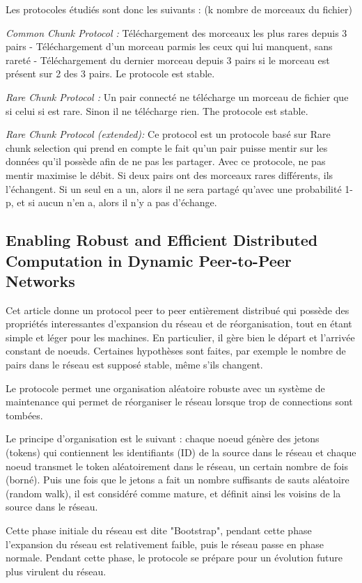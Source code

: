 \documentclass{article}
\begin{document}
Les protocoles étudiés sont donc les suivants : (k nombre de morceaux du fichier)

\emph{Common Chunk Protocol : }Téléchargement des morceaux les plus rares depuis 3 pairs  - Téléchargement
d'un morceau parmis les ceux qui lui manquent, sans rareté - Téléchargement du dernier morceau depuis 3 pairs
si le morceau est présent sur 2 des 3 pairs. Le protocole est stable.

\emph{Rare Chunk Protocol : }
Un pair connecté ne télécharge un morceau de fichier que si celui si est rare. Sinon il ne télécharge rien.
The protocole est stable.

\emph{Rare Chunk Protocol (extended): }Ce protocol est un protocole basé sur Rare chunk selection qui prend en compte
le fait qu'un pair puisse mentir sur les données qu'il possède afin de ne pas les partager. Avec ce protocole, ne pas mentir maximise le débit. Si deux pairs ont des morceaux rares différents, ils l'échangent. Si un seul en a un,
alors il ne sera partagé qu'avec une probabilité 1-p, et si aucun n'en a, alors il n'y a pas d'échange.

\subsection{Enabling Robust and Efficient Distributed Computation in Dynamic Peer-to-Peer Networks
\cite{7354403}
}

Cet article donne un protocol peer to peer entièrement distribué qui possède des propriétés interessantes
d'expansion du réseau et de réorganisation, tout en étant simple et léger pour les machines. En particulier,
il gère bien le départ et l'arrivée constant de noeuds. Certaines hypothèses
sont faites, par exemple le nombre de pairs dans le réseau est supposé stable, même s'ils changent.

Le protocole permet une organisation aléatoire robuste avec un système de maintenance qui permet de réorganiser
le réseau lorsque trop de connections sont tombées.

Le principe d'organisation est le suivant : chaque noeud génère des jetons (tokens) qui contiennent les identifiants
(ID) de la source dans le réseau et chaque noeud transmet le token aléatoirement dans le réseau, un certain nombre
de fois (borné). Puis une fois que le jetons a fait un nombre suffisants de sauts aléatoire (random walk), il est
considéré comme mature, et définit ainsi les voisins de la source dans le réseau.

Cette phase initiale du réseau est dite "Bootstrap", pendant cette phase l'expansion du réseau est relativement
faible, puis le réseau passe en phase normale. Pendant cette phase, le protocole se prépare pour un évolution
future plus virulent du réseau.
\end{document}
